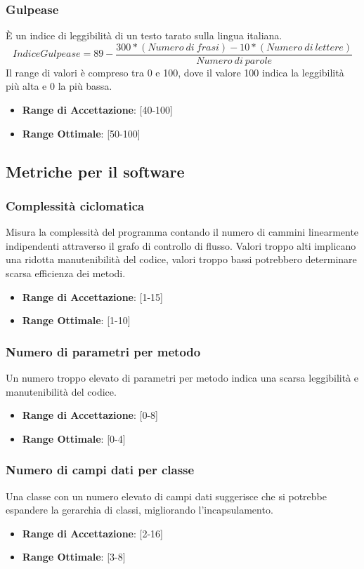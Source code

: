 \documentclass[12pt,a4paper]{article}
\begin{document}
\subsubsection{Gulpease}
È un indice di leggibilità di un testo tarato sulla lingua italiana.
\[IndiceGulpease=89-\frac{300*(Numero\ di\ frasi)-10*(Numero\ di\ lettere)}{Numero\ di\ parole}\]
Il range di valori è compreso tra 0 e 100, dove il valore 100 indica la leggibilità più alta e 0 la più bassa.
\begin{itemize}
\item \textbf{Range di Accettazione}: [40-100]
\item \textbf{Range Ottimale}: [50-100]
\end{itemize}
\subsection{Metriche per il software}\label{metriche_sw}
\subsubsection{Complessità ciclomatica}
Misura la complessità del programma contando il numero di cammini linearmente indipendenti attraverso il grafo di controllo di flusso. Valori troppo alti implicano una ridotta manutenibilità del codice, valori troppo bassi potrebbero determinare scarsa efficienza dei metodi.
\begin{itemize}
\item \textbf{Range di Accettazione}: [1-15]
\item \textbf{Range Ottimale}: [1-10]
\end{itemize}
\subsubsection{Numero di parametri per metodo}
Un numero troppo elevato di parametri per metodo indica una scarsa leggibilità e manutenibilità del codice.
\begin{itemize}
\item \textbf{Range di Accettazione}: [0-8]
\item \textbf{Range Ottimale}: [0-4]
\end{itemize}
\subsubsection{Numero di campi dati per classe}
Una classe con un numero elevato di campi dati suggerisce che si potrebbe espandere la gerarchia di classi, migliorando l'incapsulamento.
\begin{itemize}
\item \textbf{Range di Accettazione}: [2-16]
\item \textbf{Range Ottimale}: [3-8]
\end{itemize}
\end{document}
